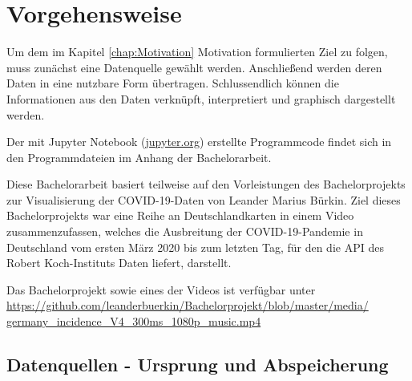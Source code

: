 \chapter{Vorgehensweise}\label{chap:Vorgehensweise}
Um dem im Kapitel \glqq{}\ref{chap:Motivation} Motivation\grqq{} formulierten Ziel zu folgen, muss zunächst eine Datenquelle gewählt werden.
Anschließend werden deren Daten in eine nutzbare Form übertragen.
Schlussendlich können die Informationen aus den Daten verknüpft, interpretiert und graphisch dargestellt werden.

Der mit Jupyter Notebook (\href{jupyter.org}{jupyter.org}) erstellte Programmcode findet sich in den Programmdateien im Anhang der Bachelorarbeit.

Diese Bachelorarbeit basiert teilweise auf den Vorleistungen des Bachelorprojekts zur Visualisierung der COVID-19-Daten von Leander Marius Bürkin.
Ziel dieses Bachelorprojekts war eine Reihe an Deutschlandkarten in einem Video zusammenzufassen, welches die Ausbreitung der COVID-19-Pandemie in Deutschland vom ersten März 2020 bis zum letzten Tag, für den die API des Robert Koch-Instituts Daten liefert, darstellt.


Das Bachelorprojekt sowie eines der Videos ist verfügbar unter\\
\href{https://github.com/leanderbuerkin/Bachelorprojekt/blob/master/media/germany_incidence_V4_300ms_1080p_music.mp4}{https://github.com/leanderbuerkin/Bachelorprojekt/blob/master/media/}\\
\href{https://github.com/leanderbuerkin/Bachelorprojekt/blob/master/media/germany_incidence_V4_300ms_1080p_music.mp4}{germany\_incidence\_V4\_300ms\_1080p\_music.mp4}

\section{Datenquellen - Ursprung und Abspeicherung}\label{sec:Datenquelle}

